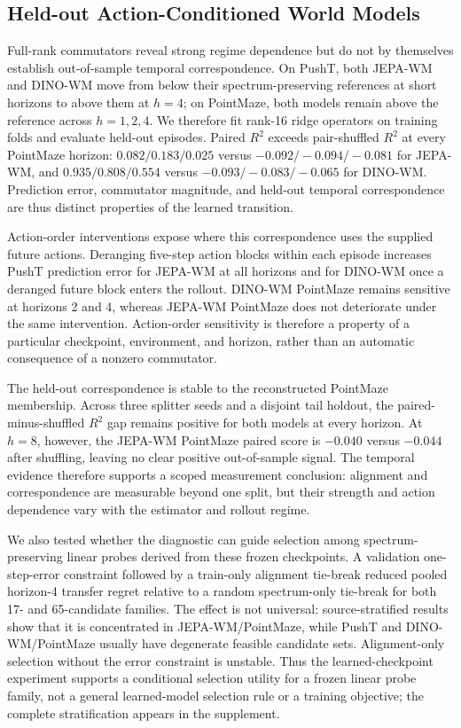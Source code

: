 \documentclass{article}
\begin{document}
\subsection{Held-out Action-Conditioned World Models}
\label{sec:temporal-world-models}

Full-rank commutators reveal strong regime dependence but do not by themselves establish out-of-sample temporal correspondence. On PushT, both JEPA-WM and DINO-WM move from below their spectrum-preserving references at short horizons to above them at $h=4$; on PointMaze, both models remain above the reference across $h=1,2,4$. We therefore fit rank-16 ridge operators on training folds and evaluate held-out episodes. Paired $R^2$ exceeds pair-shuffled $R^2$ at every PointMaze horizon: $0.082/0.183/0.025$ versus $-0.092/-0.094/-0.081$ for JEPA-WM, and $0.935/0.808/0.554$ versus $-0.093/-0.083/-0.065$ for DINO-WM. Prediction error, commutator magnitude, and held-out temporal correspondence are thus distinct properties of the learned transition.

Action-order interventions expose where this correspondence uses the supplied future actions. Deranging five-step action blocks within each episode increases PushT prediction error for JEPA-WM at all horizons and for DINO-WM once a deranged future block enters the rollout. DINO-WM PointMaze remains sensitive at horizons 2 and 4, whereas JEPA-WM PointMaze does not deteriorate under the same intervention. Action-order sensitivity is therefore a property of a particular checkpoint, environment, and horizon, rather than an automatic consequence of a nonzero commutator.

The held-out correspondence is stable to the reconstructed PointMaze membership. Across three splitter seeds and a disjoint tail holdout, the paired-minus-shuffled $R^2$ gap remains positive for both models at every horizon. At $h=8$, however, the JEPA-WM PointMaze paired score is $-0.040$ versus $-0.044$ after shuffling, leaving no clear positive out-of-sample signal. The temporal evidence therefore supports a scoped measurement conclusion: alignment and correspondence are measurable beyond one split, but their strength and action dependence vary with the estimator and rollout regime.

We also tested whether the diagnostic can guide selection among
spectrum-preserving linear probes derived from these frozen checkpoints. A
validation one-step-error constraint followed by a train-only alignment
tie-break reduced pooled horizon-4 transfer regret relative to a random
spectrum-only tie-break for both 17- and 65-candidate families. The effect is
not universal: source-stratified results show that it is concentrated in
JEPA-WM/PointMaze, while PushT and DINO-WM/PointMaze usually have degenerate
feasible candidate sets. Alignment-only selection without the error constraint
is unstable. Thus the learned-checkpoint experiment supports a conditional
selection utility for a frozen linear probe family, not a general learned-model
selection rule or a training objective; the complete stratification appears in
the supplement.
\end{document}
